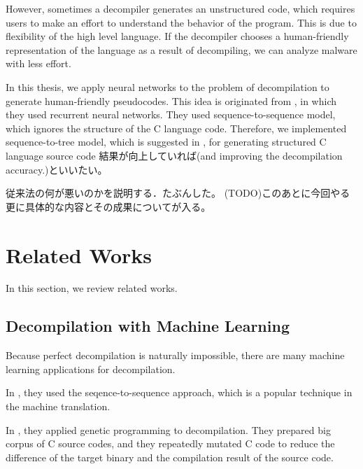 \documentclass[senior,final,11pt]{iscs-thesis}
\begin{document}
However, sometimes a decompiler generates an unstructured code, which requires users to make an effort to understand the behavior of the program. 
This is due to flexibility of the high level language. If the decompiler chooses a human-friendly representation of the language as a result of decompiling, we can analyze malware with less effort. 

In this thesis, we apply neural networks to the problem of decompilation to generate human-friendly pseudocodes. 
This idea is originated from \cite{Motoneta}, in which they used recurrent neural networks.
They used sequence-to-sequence model, which ignores the structure of the C language code. 
Therefore, we implemented sequence-to-tree model, which is suggested in \cite{Seq2Tree}, for generating structured C language source code 
結果が向上していれば(and improving the decompilation accuracy.)といいたい。

従来法の何が悪いのかを説明する．たぶんした。
(TODO)このあとに今回やる更に具体的な内容とその成果についてが入る。

\section{Related Works}
In this section, we review related works.

\subsection{Decompilation with Machine Learning}

Because perfect decompilation is naturally impossible, there are many machine learning applications for decompilation.

In \cite{Motoneta}, they used the seqence-to-sequence approach, which is a popular technique in the machine translation.

In \cite{genetic_decompiler}, they applied genetic programming to decompilation.
They prepared big corpus of C source codes, and they repeatedly mutated C code to reduce the difference of the target binary and the compilation result of the source code. 




% 
\end{document}

